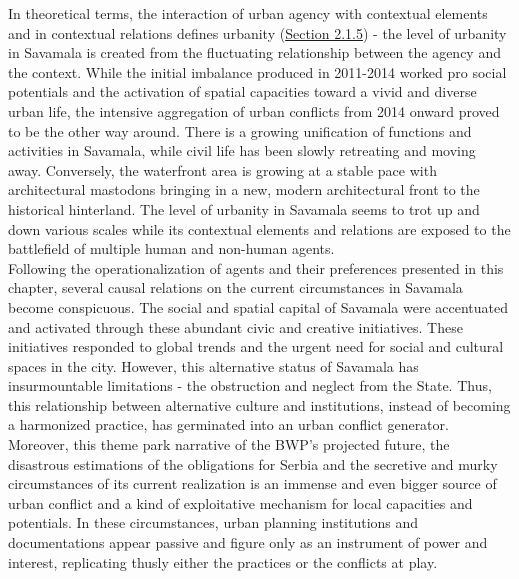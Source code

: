 \documentclass[11pt]{report}
\begin{document}
In theoretical terms, the interaction of urban agency with contextual elements and in contextual relations defines urbanity (\href{Section 2.1.5}{Section 2.1.5}) - the level of urbanity in Savamala is created from the fluctuating relationship between the agency and the context. While the initial imbalance produced in 2011-2014 worked pro social potentials and the activation of spatial capacities toward a vivid and diverse urban life, the intensive aggregation of urban conflicts from 2014 onward proved to be the other way around. There is a growing unification of functions and activities in Savamala, while civil life has been slowly retreating and moving away. Conversely, the waterfront area is growing at a stable pace with architectural mastodons bringing in a new, modern architectural front to the historical hinterland. The level of urbanity in Savamala seems to trot up and down various scales while its contextual elements and relations are exposed to the battlefield of multiple human and non-human agents.
\\

Following the operationalization of agents and their preferences presented in this chapter, several causal relations on the current circumstances in Savamala become conspicuous.
The social and spatial capital of Savamala were accentuated and activated through these abundant civic and creative initiatives.
These initiatives responded to global trends and the urgent need for social and cultural spaces in the city.
However, this alternative status of Savamala has insurmountable limitations - the obstruction and neglect from the State.
Thus, this relationship between alternative culture and institutions, instead of becoming a harmonized practice, has germinated into an urban conflict generator.
\\

Moreover, this theme park narrative of the BWP's projected future, the disastrous estimations of the obligations for Serbia and the secretive and murky circumstances of its current realization is an immense and even bigger source of urban conflict and a kind of exploitative mechanism for local capacities and potentials.
In these circumstances, urban planning institutions and documentations appear passive and figure only as an instrument of power and interest, replicating thusly either the practices or the conflicts at play.
\\
\end{document}
